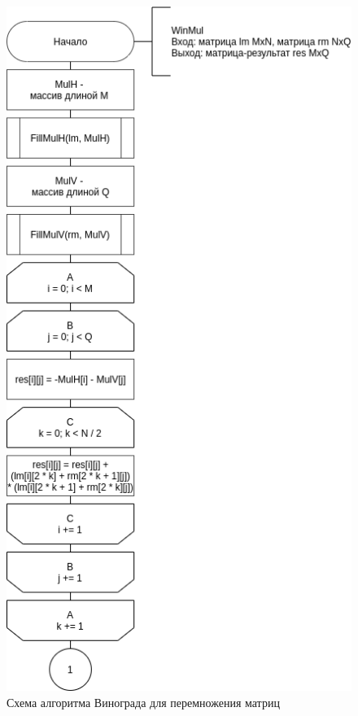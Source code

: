 \begin{figure}[!htb]
	\centering
	\includegraphics[scale=0.6]{schemes/win-top}
	\caption{Схема алгоритма Винограда для перемножения матриц}
	\label{scheme:win-top}
\end{figure}


